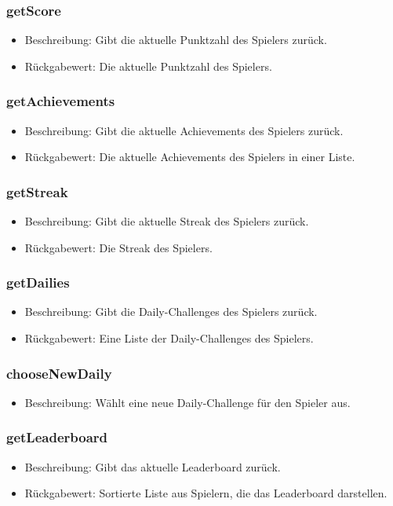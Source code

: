 \documentclass[a4paper]{scrreprt}
\begin{document}
   \subsubsection{getScore}
   \begin{itemize}
   \item Beschreibung: Gibt die aktuelle Punktzahl des Spielers zurück.
   \item Rückgabewert: Die aktuelle Punktzahl des Spielers.
\end{itemize}
   \subsubsection{getAchievements}
   \begin{itemize}
   \item Beschreibung: Gibt die aktuelle Achievements des Spielers zurück.
   \item Rückgabewert: Die aktuelle Achievements des Spielers in einer Liste.
\end{itemize}
   \subsubsection{getStreak}
   \begin{itemize}
   \item Beschreibung: Gibt die aktuelle Streak des Spielers zurück.
   \item Rückgabewert: Die Streak des Spielers.
\end{itemize}
   \subsubsection{getDailies}
   \begin{itemize}
   \item Beschreibung: Gibt die Daily-Challenges des Spielers zurück.
   \item Rückgabewert: Eine Liste der Daily-Challenges des Spielers.
  \end{itemize}
   \subsubsection{chooseNewDaily}
   \begin{itemize}
   \item Beschreibung: Wählt eine neue Daily-Challenge für den Spieler aus.
  \end{itemize}
   \subsubsection{getLeaderboard}
   \begin{itemize}
     \item Beschreibung: Gibt das aktuelle Leaderboard zurück.
     \item Rückgabewert: Sortierte Liste aus Spielern, die das Leaderboard darstellen.
   \end{itemize}
   
\end{document}
